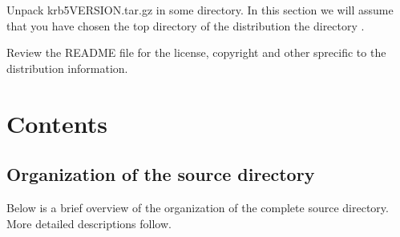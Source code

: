 \documentclass[letterpaper,10pt,english]{sphinxmanual}
\begin{document}
\begin{sphinxVerbatim}[commandchars=\\\{\}]
  
  
\end{sphinxVerbatim}

\sphinxAtStartPar
Unpack krb5\sphinxhyphen{}VERSION.tar.gz in some directory. In this section we will assume
that you have chosen the top directory of the distribution the directory
.

\sphinxAtStartPar
Review the README file for the license, copyright and other sprecific to the
distribution information.


\chapter{Contents}
\label{\detokenize{build/index:contents}}

\section{Organization of the source directory}
\label{\detokenize{build/directory_org:organization-of-the-source-directory}}\label{\detokenize{build/directory_org::doc}}
\sphinxAtStartPar
Below is a brief overview of the organization of the complete source
directory.  More detailed descriptions follow.
\end{document}
